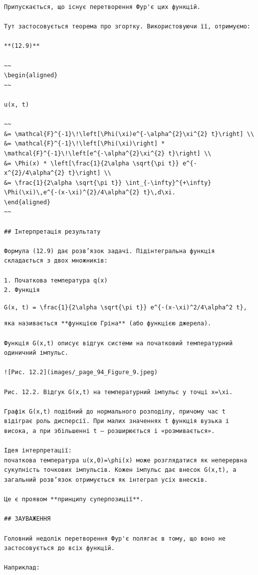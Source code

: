 \documentclass[
  ukrainian,
]{article}
\begin{document}
\begin{verbatim}
Припускається, що існує перетворення Фур'є цих функцій.

Тут застосовується теорема про згортку. Використовуючи її, отримуємо:

**(12.9)**

~~
\begin{aligned}
~~

u(x, t)

~~
&= \mathcal{F}^{-1}\!\left[\Phi(\xi)e^{-\alpha^{2}\xi^{2} t}\right] \\
&= \mathcal{F}^{-1}\!\left[\Phi(\xi)\right] * \mathcal{F}^{-1}\!\left[e^{-\alpha^{2}\xi^{2} t}\right] \\
&= \Phi(x) * \left[\frac{1}{2\alpha \sqrt{\pi t}} e^{-x^{2}/4\alpha^{2} t}\right] \\
&= \frac{1}{2\alpha \sqrt{\pi t}} \int_{-\infty}^{+\infty} \Phi(\xi)\,e^{-(x-\xi)^{2}/4\alpha^{2} t}\,d\xi.
\end{aligned}
~~

## Інтерпретація результату

Формула (12.9) дає розв’язок задачі. Підінтегральна функція складається з двох множників:

1. Початкова температура q(x)  
2. Функція
\end{verbatim}

\texttt{G(x,\ t)\ =\ \textbackslash{}frac\{1\}\{2\textbackslash{}alpha\ \textbackslash{}sqrt\{\textbackslash{}pi\ t\}\}\ e\^{}\{-(x-\textbackslash{}xi)\^{}2/4\textbackslash{}alpha\^{}2\ t\},}

\begin{verbatim}
яка називається **функцією Гріна** (або функцією джерела).

Функція G(x,t) описує відгук системи на початковий температурний одиничний імпульс.

![Рис. 12.2](images/_page_94_Figure_9.jpeg)

Рис. 12.2. Відгук G(x,t) на температурний імпульс у точці x=\xi.

Графік G(x,t) подібний до нормального розподілу, причому час t відіграє роль дисперсії. При малих значеннях t функція вузька і висока, а при збільшенні t — розширюється і «розмивається».

Ідея інтерпретації:  
початкова температура u(x,0)=\phi(x) може розглядатися як неперервна сукупність точкових імпульсів. Кожен імпульс дає внесок G(x,t), а загальний розв’язок отримується як інтеграл усіх внесків.

Це є проявом **принципу суперпозиції**.

## ЗАУВАЖЕННЯ

Головний недолік перетворення Фур'є полягає в тому, що воно не застосовується до всіх функцій.

Наприклад:
\end{verbatim}
\end{document}
